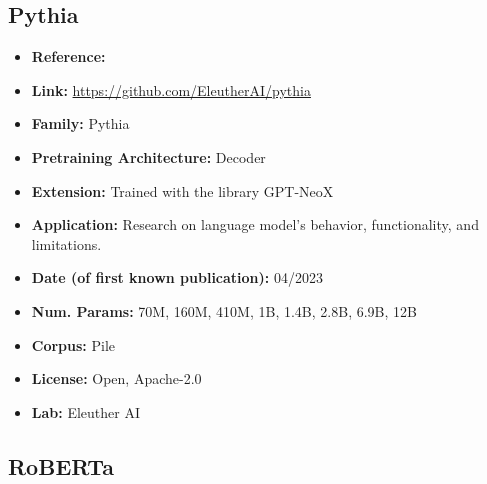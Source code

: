 \documentclass{article}
\begin{document}
\subsection{Pythia}
            \begin{itemize}
                \item \textbf{Reference:} \href{https://arxiv.org/abs/2304.01373}{}
                \item \textbf{Link:} \url{https://github.com/EleutherAI/pythia}
                \item \textbf{Family:} Pythia
                \item \textbf{Pretraining Architecture:} Decoder
                \item \textbf{Extension:} Trained with the library GPT-NeoX
                \item \textbf{Application:} Research on language model's behavior, functionality, and limitations.
                \item \textbf{Date (of first known publication):} 04/2023
                \item \textbf{Num. Params:} 70M, 160M, 410M, 1B, 1.4B, 2.8B, 6.9B, 12B
                \item \textbf{Corpus:} Pile
                \item \textbf{License:} Open, Apache-2.0
                \item \textbf{Lab:} Eleuther AI
            \end{itemize}
            
\subsection{RoBERTa}
\end{document}
